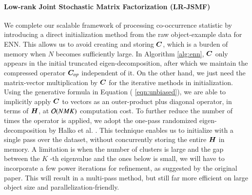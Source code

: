 \paragraph{Low\hyp{}rank Joint Stochastic Matrix Factorization (LR-JSMF)} 
We complete our scalable framework of processing co\hyp{}occurrence statistic by
introducing a direct initialization method from the raw object-example data for
ENN. This allows us to avoid creating and storing $\bm{C}$, which is a burden of
memory when $N$ becomes sufficiently large. In Algorithm \ref{alg:enn}, $\bm{C}$
only appears in the initial truncated eigen\hyp{}decomposition, after which we
maintain the compressed operator $\bm{C}_{op}$ independent of it. On the other
hand, we just need the matrix\hyp{}vector multiplication by $\bm{C}$ for the
iterative methods in initialization. Using the generative formula in Equation (
\ref{eqn:unbiased}), we are able to implicitly apply $\bm{C}$ to vectors as an
outer\hyp{}product plus diagonal operator, in terms of $\bm{H}$, at $\mathcal{O}(NMK)$
computation cost. To further reduce the number of times the operator is applied,
we adopt the one-pass randomized eigen\hyp{}decomposition by Halko et al. 
\cite{halko2011finding}. This technique enables us to initialize with a single
pass over the dataset, without concurrently storing the entire $\bm{H}$ in memory.
A limitation is when the number of clusters is large and the gap between the $K$
\hyp{}th eigenvalue and the ones below is small, we will have to incorporate a
few power iterations for refinement, as suggested by the original paper. This
will result in a multi\hyp{}pass method, but still far more efficient on large
object size and parallelization-friendly.